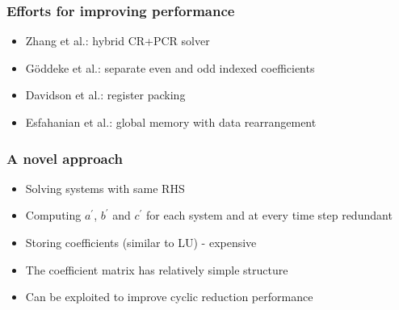 \begin{frame}
\frametitle{Efforts for improving performance}
\begin{itemize}
    \item Zhang et al.: hybrid CR+PCR solver
    \item G{\"o}ddeke et al.: separate even and odd indexed
        coefficients
    \item Davidson et al.: register packing
    \item Esfahanian et al.: global memory with data rearrangement
\end{itemize}
\end{frame}

\begin{frame}
\frametitle{A novel approach}
\begin{itemize}
\item Solving systems with same RHS
\item Computing $a^\prime$, $b^\prime$ and $c^\prime$
    for each system and at every time step redundant
\item Storing coefficients (similar to LU) - expensive
\item The coefficient matrix has relatively simple structure
\item Can be exploited to improve cyclic reduction performance
\end{itemize}
\end{frame}

